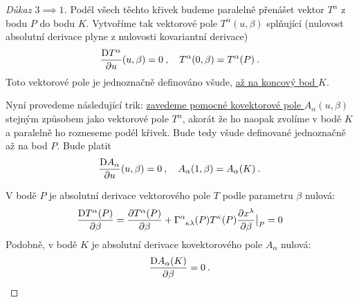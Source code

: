 \documentclass{article}
\begin{document}
\begin{proof}[Důkaz $3 \implies 1$]
    Podél všech těchto křivek budeme paralelně přenášet vektor $T^\alpha$ z bodu $P$ do bodu $K$. Vytvoříme tak vektorové pole $T^\alpha(u,\beta)$ splňující (nulovost absolutní derivace plyne z nulovosti kovariantní derivace)
    \begin{align}
        \frac{\mathrm{D} T^\alpha}{\partial u}(u,\beta) = 0 \:, \quad T^\alpha(0,\beta) = T^\alpha(P) \:. \label{eq:prenos-vektoru}
    \end{align}
    Toto vektorové pole je jednoznačně definováno všude, \underline{až na koncový bod $K$}.

    Nyní provedeme následující trik: \underline{zavedeme pomocné kovektorové pole $A_\alpha(u,\beta)$} stejným způsobem jako vektorové pole  $T^\alpha$, akorát že ho naopak zvolíme v bodě $K$ a paralelně ho rozneseme podél křivek. Bude tedy všude definované jednoznačně až na bod $P$. Bude platit
    \begin{align}
        \frac{\mathrm{D} A_\alpha}{\partial u}(u,\beta) = 0 \:, \quad A_\alpha(1,\beta) = A_\alpha(K) \:.
    \end{align}

    V bodě $P$ je absolutní derivace vektorového pole $T$ podle parametru $\beta$ nulová:
    \begin{align}
        \apder{T^\alpha(P)}{\beta} = \pder{T^\alpha(P)}{\beta} + \Gamma\indices{^\alpha_\kappa_\lambda}(P) T^\kappa(P) \pder{x^\lambda}{\beta}\big|_P = 0
    \end{align}
    Podobně, v bodě $K$ je absolutní derivace kovektorového pole $A_\alpha$ nulová:
    \begin{align}
        \frac{\mathrm{D} A_\alpha(K)}{\partial \beta} = 0 \:.
    \end{align}


\end{proof}
\end{document}
